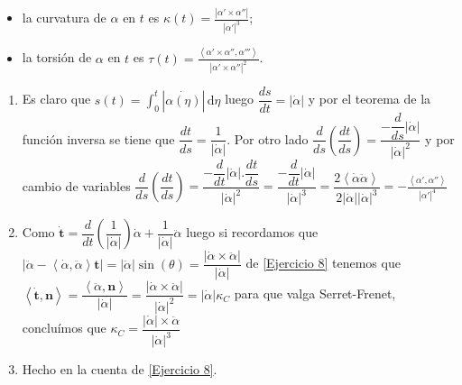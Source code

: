 \documentclass[11pt]{article}
\newcommand\dd{\,\mathrm{d}}
\newcommand\abs[1]{\left\lvert#1\right\rvert}
\newcommand\ip[1]{\left\langle#1\right\rangle}
\renewcommand\tt{\mathbf{t}}
\newcommand\nn{\mathbf{n}}
\newenvironment{proof}[1][Demostraci\'on]{\begin{trivlist}
		\item[\hskip \labelsep {\bfseries #1}]}{\end{trivlist}}
\newcommand{\qed}{\nobreak \ifvmode \relax \else
	\ifdim\lastskip<1.5em \hskip-\lastskip
	\hskip1.5em plus0em minus0.5em \fi \nobreak
	\vrule height0.75em width0.5em depth0.25em\fi}
\begin{document}
\begin{enumerate}
\begin{itemize}
		\item la curvatura de $\alpha$ en $t$ es
		$\kappa(t) = \frac{\abs{\alpha'\times \alpha''}}{\abs{\alpha'}^3}$;
		
		\item la torsi\'on de $\alpha$ en $t$ es
		$\tau(t)=\frac{\ip{\alpha' \times \alpha'' , \alpha'''}}{\abs{\alpha' \times \alpha''}^2}$.
		
	\end{itemize}
	
	\label{Ejercicio 9}
	
	\begin{proof}
		
		\begin{enumerate}
			
			\item Es claro que $s(t) = \int_{0}^{t}{\abs{\dot{\alpha(\eta)}}\dd \eta}$ luego $\dfrac{ds}{dt} = \abs{\dot{\alpha}}$ y por el teorema de la funci\'on inversa se tiene que $\dfrac{dt}{ds} = \dfrac{1}{\abs{\dot{\alpha}}}$. Por otro lado $\dfrac{d}{ds} \left(\dfrac{dt}{ds}\right) = \dfrac{-\dfrac{d}{ds}\abs{\dot{\alpha}}}{\abs{\dot{\alpha}}^2}$ y por cambio de variables $\dfrac{d}{ds} \left(\dfrac{dt}{ds}\right) = \dfrac{-\dfrac{d}{dt}\abs{\dot{\alpha}} . \dfrac{dt}{ds}}{\abs{\dot{\alpha}}^2} = \dfrac{-\dfrac{d}{dt}\abs{\dot{\alpha}}} {\abs{\dot{\alpha}}^3} = \dfrac{2 \ip{\dot{\alpha}{\ddot{\alpha}}}}{2 \abs{\dot{\alpha}}  \abs{\dot{\alpha}}^3} = -\frac{\ip{\alpha',\alpha''}}{\abs{\alpha'}^4}$	
			
			\item Como $\dot{\tt} = \dfrac{d}{dt} \left(\dfrac{1}{\abs{\dot{\alpha}}}\right) \dot{\alpha} + \dfrac{1}{\abs{\dot{\alpha}}} \ddot{\alpha} $ luego si recordamos que $\abs{\ddot{\alpha} - \ip{\dot{\alpha},\ddot{\alpha}}\tt} = \abs{\ddot{\alpha}}\sin(\theta) = \dfrac{\abs{\dot{\alpha} \times \ddot{\alpha}}}{\abs{\dot{\alpha}}} $ de \ref{Ejercicio 8} tenemos que $\ip{\dot{\tt} , \nn} = \dfrac{\ip{\ddot{\alpha} , \nn}}{\abs{\dot{\alpha}}} = \dfrac{\abs{\dot{\alpha} \times \ddot{\alpha}}}{\abs{\dot{\alpha}}^2} = \abs{\dot{\alpha}} \kappa_C$ para que valga Serret-Frenet, conclu\'imos que $\kappa_C = \dfrac{\abs{\dot{\alpha}} \times \ddot{\alpha}}{\abs{\dot{\alpha}}^3}$
			
			\item Hecho en la cuenta de \ref{Ejercicio 8}. \qed
					
		\end{enumerate}
		
	\end{proof}
	

\end{enumerate}
\end{document}
